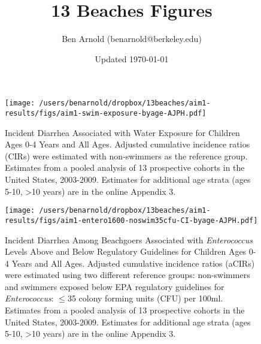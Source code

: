 \documentclass[11pt]{article}
\title{13 Beaches Figures}
\author{Ben Arnold (benarnold@berkeley.edu)}
\date{Updated \today}
\begin{document}
\begin{figure}[htbp]
\begin{center}
\texttt{[image: /users/benarnold/dropbox/13beaches/aim1-results/figs/aim1-swim-exposure-byage-AJPH.pdf]}
\begin{minipage}{\textwidth}
\caption{Incident Diarrhea Associated with Water Exposure for Children Ages 0-4 Years and All Ages. Adjusted cumulative incidence ratios (CIRs) were estimated with non-swimmers as the reference group. Estimates from a pooled analysis of 13 prospective cohorts in the United States, 2003-2009. Estimates for additional age strata (ages 5-10, >10 years) are in the online Appendix 3.}
\label{fig:swimex}
\end{minipage}
\end{center}
\end{figure}

\begin{figure}[htbp]
\begin{center}
\texttt{[image: /users/benarnold/dropbox/13beaches/aim1-results/figs/aim1-entero1600-noswim35cfu-CI-byage-AJPH.pdf]} \\
\begin{minipage}{\textwidth}
\caption{Incident Diarrhea Among Beachgoers Associated with \textit{Enterococcus} Levels Above and Below Regulatory Guidelines for Children Ages 0-4 Years and All Ages. Adjusted cumulative incidence ratios (aCIRs) were estimated using two different reference groups: non-swimmers and swimmers exposed below EPA regulatory guidelines for \textit{Enterococcus}: $\leq$35 colony forming units (CFU) per 100ml. Estimates from a pooled analysis of 13 prospective cohorts in the United States, 2003-2009. Estimates for additional age strata (ages 5-10, >10 years) are in the online Appendix 3. }
\label{fig:enteroregulatory}
\end{minipage}
\end{center}
\end{figure}
\end{document}
